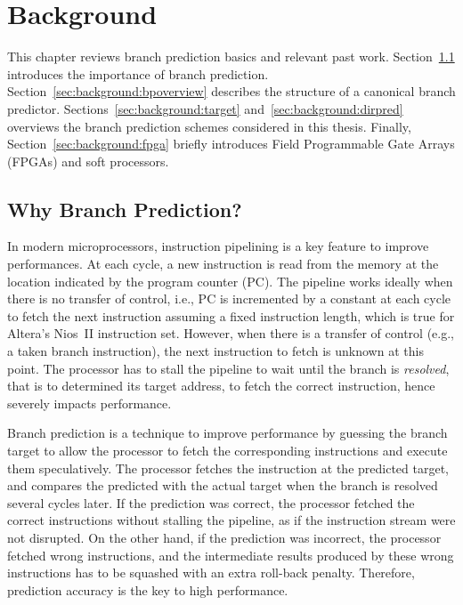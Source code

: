 \chapter{Background}
\label{chap:background}
This chapter reviews branch prediction basics and relevant past work. Section~\ref{sec:background:whybp} introduces the importance of branch prediction. Section~\ref{sec:background:bpoverview} describes the structure of a canonical branch predictor. Sections~\ref{sec:background:target} and~\ref{sec:background:dirpred} overviews the branch prediction schemes considered in this thesis. Finally, Section~\ref{sec:background:fpga} briefly introduces Field Programmable Gate Arrays (FPGAs) and soft processors.

\section{Why Branch Prediction?}
\label{sec:background:whybp}
In modern microprocessors, instruction pipelining is a key feature to improve performances. At each cycle, a new instruction is read from the memory at the location indicated by the program counter (PC). The pipeline works ideally when there is no transfer of control, i.e., PC is incremented by a constant at each cycle to fetch the next instruction assuming a fixed instruction length, which is true for Altera's Nios~II instruction set. However, when there is a transfer of control (e.g., a taken branch instruction), the next instruction to fetch is unknown at this point. The processor has to stall the pipeline to wait until the branch is \textit{resolved}, that is to determined its target address, to fetch the correct instruction, hence severely impacts performance.

Branch prediction is a technique to improve performance by guessing the branch target  to allow the processor to fetch the corresponding instructions and execute them speculatively. The processor fetches the instruction at the predicted target, and compares the predicted with the actual target when the branch is resolved several cycles later. If the prediction was correct, the processor fetched the correct instructions without stalling the pipeline, as if the instruction stream were not disrupted. On the other hand, if the prediction was incorrect, the processor fetched wrong instructions, and the intermediate results produced by these wrong instructions has to be squashed with an extra roll-back penalty. Therefore, prediction accuracy is the key to high performance.

